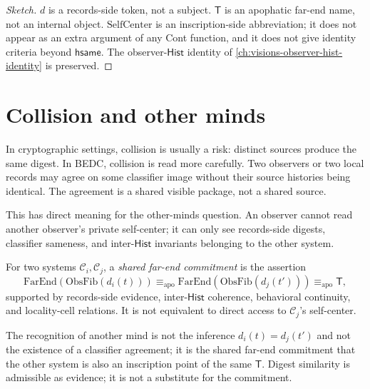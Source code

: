 \begin{proof}[Sketch]
$d$ is a records-side token, not a subject. $\mathsf{T}$ is an apophatic far-end name, not an internal object. $\mathrm{SelfCenter}$ is an inscription-side abbreviation; it does not appear as an extra argument of any Cont function, and it does not give identity criteria beyond $\mathsf{hsame}$. The observer-$\mathsf{Hist}$ identity of \autoref{ch:visions-observer-hist-identity} is preserved.
\end{proof}

\section{Collision and other minds}
\label{sec:hash-like-collision-other-minds}

In cryptographic settings, collision is usually a risk: distinct sources produce the same digest. In BEDC, collision is read more carefully. Two observers or two local records may agree on some classifier image without their source histories being identical. The agreement is a shared visible package, not a shared source.

This has direct meaning for the other-minds question. An observer cannot read another observer's private self-center; it can only see records-side digests, classifier sameness, and inter-$\mathsf{Hist}$ invariants belonging to the other system.

\begin{definition}
\label{def:hash-like-shared-far-end-commitment}
For two systems $\mathcal{C}_i, \mathcal{C}_j$, a \emph{shared far-end commitment} is the assertion
$$
\mathrm{FarEnd}(\mathrm{ObsFib}(d_i(t))) \equiv_{\mathrm{apo}} \mathrm{FarEnd}(\mathrm{ObsFib}(d_j(t'))) \equiv_{\mathrm{apo}} \mathsf{T},
$$
supported by records-side evidence, inter-$\mathsf{Hist}$ coherence, behavioral continuity, and locality-cell relations. It is not equivalent to direct access to $\mathcal{C}_j$'s self-center.
\end{definition}

\begin{principle}
\label{prin:hash-like-other-minds-not-collision}
The recognition of another mind is not the inference $d_i(t) = d_j(t')$ and not the existence of a classifier agreement; it is the shared far-end commitment that the other system is also an inscription point of the same $\mathsf{T}$. Digest similarity is admissible as evidence; it is not a substitute for the commitment.
\end{principle}

